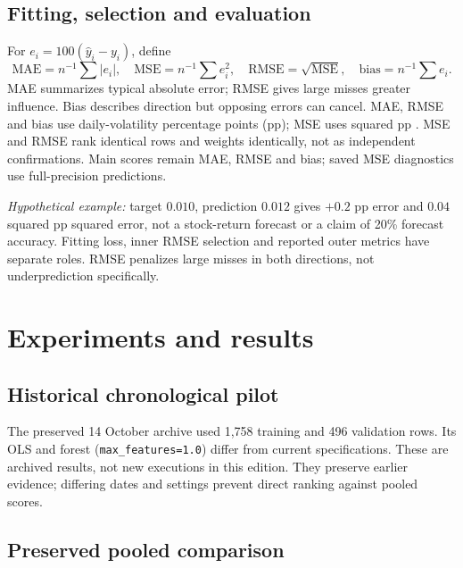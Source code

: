 \documentclass[10pt,letterpaper]{article}
\newcommand{\code}[1]{\texttt{\small #1}}\newcommand{\sd}{\operatorname{sd}}
\begin{document}
\subsection{Fitting, selection and evaluation}
For $e_i=100(\hat y_i-y_i)$, define
\[
\mathrm{MAE}=n^{-1}\sum|e_i|,\quad \mathrm{MSE}=n^{-1}\sum e_i^2,\quad
\mathrm{RMSE}=\sqrt{\mathrm{MSE}},\quad \mathrm{bias}=n^{-1}\sum e_i.
\]
MAE summarizes typical absolute error; RMSE gives large misses greater influence.
Bias describes direction but opposing errors can cancel. MAE, RMSE and bias use
daily-volatility percentage points (pp); MSE uses squared pp \cite{mse_api}.
MSE and RMSE rank identical rows and weights identically, not as independent
confirmations. Main scores remain MAE, RMSE and bias; saved MSE diagnostics use
full-precision predictions.

\textit{Hypothetical example:} target $0.010$, prediction $0.012$ gives $+0.2$ pp
error and $0.04$ squared pp squared error, not a stock-return forecast or a claim
of 20\% forecast accuracy. Fitting loss, inner RMSE selection and reported outer
metrics have separate roles. RMSE penalizes large misses in both directions,
not underprediction specifically.


\clearpage\section{Experiments and results}
\subsection{Historical chronological pilot}
\begin{center}\small\end{center}
The preserved 14 October archive used 1,758 training and 496 validation rows.
Its OLS and forest (\code{max\_features=1.0}) differ from current specifications.
These are archived results, not new executions in this edition. They preserve
earlier evidence; differing dates and settings prevent direct ranking against pooled scores.

\subsection{Preserved pooled comparison}
\begin{center}\end{center}

\begin{center}\end{center}


\end{document}

